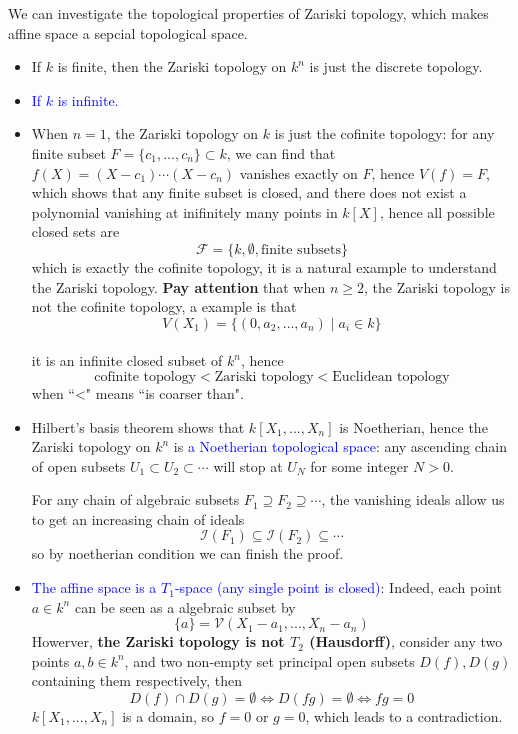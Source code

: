 We can investigate the topological properties of Zariski topology, which makes affine space a sepcial topological space.
\begin{itemize}
    \item If \(k\) is finite, then the Zariski topology on \(k^n\) is just the discrete topology.
    \item[] \textcolor{blue}{If \(k\) is infinite.}

    \item  When \(n = 1\), the Zariski topology on \(k\) is just the cofinite topology: for any finite subset \(F = \{c_1,...,c_n\}\subset k\), we can find that \(f(X) = (X-c_1)\cdots(X-c_n)\) vanishes exactly on \(F\), hence \(V(f) = F\), which shows that any finite subset is closed, and there does not exist a polynomial vanishing at inifinitely many points in \(k[X]\), hence all possible closed sets are
    \[\mathcal{F} = \{k,\emptyset,\text{finite subsets}\}\]
    which is exactly the cofinite topology, it is a natural example to understand the Zariski topology. \textbf{Pay attention} that when \(n\geq 2\), the Zariski topology is not the cofinite topology, a example is that 
    \[V(X_1) = \{(0,a_2,\dots,a_n) \mid a_i \in k\}\]\\
    it is an infinite closed subset of \(k^n\), hence 
    \[\text{cofinite topology} < \text{Zariski topology} < \text{Euclidean topology}\]
    when “<" means “is coarser than".

    \item Hilbert's basis theorem shows that \(k[X_1,...,X_n]\) is Noetherian, hence the Zariski topology on \(k^n\) is \textcolor{blue}{a Noetherian topological space}: any ascending chain of open subsets \(U_1 \subset U_2 \subset \cdots\) will stop at \(U_N\) for some integer \(N > 0\).
    
    For any chain of algebraic subsets \(F_1 \supseteq F_2 \supseteq \cdots\), the vanishing ideals allow us to get an increasing chain of ideals
    \[\mathcal{I}(F_1) \subseteq \mathcal{I}(F_2) \subseteq \cdots\]
    so by noetherian condition we can finish the proof.

    \item \textcolor{blue}{The affine space is a \(T_1\)-space (any single point is closed)}: Indeed, each point \(a \in k^n\) can be seen as a algebraic subset by
    \[\{a\} = \mathcal{V}(X_1 - a_1,...,X_n - a_n)\]
    Howerver, \textbf{the Zariski topology is not \(T_2\) (Hausdorff)}, consider any two points \(a,b \in k^n\), and two non-empty set principal open subsets \(D(f), D(g)\) containing them respectively, then
    \[D(f) \cap D(g) = \emptyset \iff D(fg) = \emptyset \iff fg = 0\]
    \(k[X_1,...,X_n]\) is a domain, so \(f = 0\) or \(g = 0\), which leads to  a contradiction.
    

\end{itemize}
